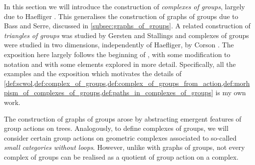 In this section we will introduce the construction of \emph{complexes of groups}, largely due to Haefliger \cite{haefliger_complexes_1991}.
This generalises the construction of graphs of groups due to Bass and Serre, discussed in \cref{subsec:graphs_of_groups}.
A related construction of \emph{triangles of groups} was studied by Gersten and Stallings \cite{stallings_nonpositively_1991} and complexes of groups were studied in two dimensions, independently of Haefliger, by Corson \cite{corson_complexes_1992}.
The exposition here largely follows the beginning of \cite[Chapter 3.\textrm{\ensuremath{\calc}}]{BrHa11}, with some modification to notation and with some elements explored in more detail.
Specifically, all the examples and the exposition which motivates the details of \cref{def:scwol,def:complex_of_groups,def:complex_of_groups_from_action,def:morhpism_of_complexes_of_groups,def:paths_in_complexes_of_groups} is my own work.

The construction of graphs of groups arose by abstracting emergent features of group actions on trees.
Analogously, to define complexes of groups, we will consider certain group actions on geometric complexes associated to so-called \emph{small categories without loops}.
However, unlike with graphs of groups, not every complex of groups can be realised as a quotient of group action on a complex.
